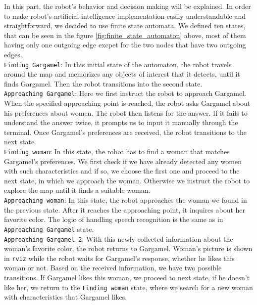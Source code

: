 \documentclass[12pt,a4paper]{article}
\begin{document}
	In this part, the robot's behavior and decision making will be explained. In order to make robot's artificial intelligence implementation easily understandable and straightforward, we decided to use finite state automata. We defined ten states, that can be seen in the figure \ref{fig:finite_state_automaton} above, most of them having only one outgoing edge excpet for the two nodes that have two outgoing edges. \\

	\texttt{Finding Gargamel}: In this initial state of the automaton, the robot travels around the map and memorizes any objects of interest that it detects, until it finds Gargamel. Then the robot transitions into the second state. \\

	\texttt{Approaching Gargamel}: Here we first instruct the robot to approach Gargamel. When the specified approaching point is reached, the robot asks Gargamel about his preferences about women. The robot then listens for the answer. If it fails to understand the answer twice, it prompts us to input it manually through the terminal. Once Gargamel's preferences are received, the robot transitions to the next state. \\

	\texttt{Finding woman}: In this state, the robot has to find a woman that matches Gargamel's preferences. We first check if we have already detected any women with such characteristics and if so, we choose the first one and proceed to the next state, in which we approach the woman. Otherwise we instruct the robot to explore the map until it finds a suitable woman. \\

	\texttt{Approaching woman}: In this state, the robot approaches the woman we found in the previous state. After it reaches the approaching point, it inquires about her favorite color. The logic of handling speech recognition is the same as in \texttt{Approaching Gargamel} state. \\

	\texttt{Approaching Gargamel 2}: With this newly collected information about the woman's favorite color, the robot returns to Gargamel. Woman's picture is shown in \texttt{rviz} while the robot waits for Gargamel's response, whether he likes this woman or not. Based on the received information, we have two possible transitions. If Gargamel likes this woman, we proceed to next state, if he doesn't like her, we return to the \texttt{Finding woman} state, where we search for a new woman with characteristics that Gargamel likes. \\
\end{document}
